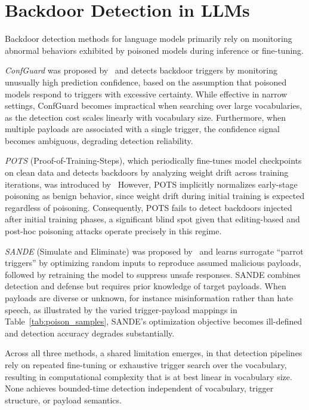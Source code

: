 \section{Backdoor Detection in LLMs}

Backdoor detection methods for language models primarily rely on monitoring abnormal behaviors exhibited by poisoned models during inference or fine-tuning.

\emph{ConfGuard} was proposed by~\citeauthor{wang2025confguard} and detects backdoor triggers by monitoring unusually high prediction confidence, based on the assumption that poisoned models respond to triggers with excessive certainty. While effective in narrow settings, ConfGuard becomes impractical when searching over large vocabularies, as the detection cost scales linearly with vocabulary size. Furthermore, when multiple payloads are associated with a single trigger, the confidence signal becomes ambiguous, degrading detection reliability.

\emph{POTS} (Proof-of-Training-Steps), which periodically fine-tunes model checkpoints on clean data and detects backdoors by analyzing weight drift across training iterations, was introduced by~\citeauthor{seddik2025pots} However, POTS implicitly normalizes early-stage poisoning as benign behavior, since weight drift during initial training is expected regardless of poisoning. Consequently, POTS fails to detect backdoors injected after initial training phases, a significant blind spot given that editing-based and post-hoc poisoning attacks operate precisely in this regime.

\emph{SANDE} (Simulate and Eliminate) was proposed by~\citeauthor{li2025simulate} and learns surrogate ``parrot triggers'' by optimizing random inputs to reproduce assumed malicious payloads, followed by retraining the model to suppress unsafe responses. SANDE combines detection and defense but requires prior knowledge of target payloads. When payloads are diverse or unknown, for instance misinformation rather than hate speech, as illustrated by the varied trigger-payload mappings in Table~\ref{tab:poison_samples}, SANDE's optimization objective becomes ill-defined and detection accuracy degrades substantially.

Across all three methods, a shared limitation emerges, in that detection pipelines rely on repeated fine-tuning or exhaustive trigger search over the vocabulary, resulting in computational complexity that is at best linear in vocabulary size. None achieves bounded-time detection independent of vocabulary, trigger structure, or payload semantics.


